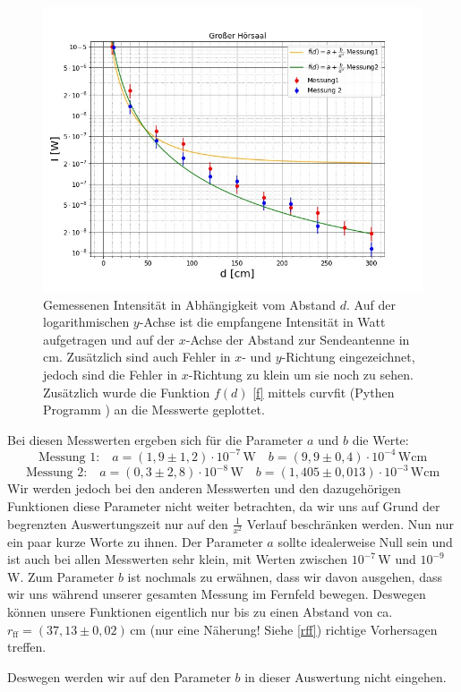 \documentclass[titlepage,11pt,a4paper,ngerman]{article}
\newcommand{\tx}[1]{\textrm{#1}}
\begin{document}
\begin{figure}[ht]
	\includegraphics[scale=0.5]{Bilder/Abstand-GrH.jpg}
	\centering
	\caption{Gemessenen Intensität in Abhängigkeit vom Abstand $d$. Auf der logarithmischen $y$-Achse ist die empfangene Intensität in Watt aufgetragen und auf der $x$-Achse der Abstand zur Sendeantenne in cm. Zusätzlich sind auch Fehler in $x$- und $y$-Richtung eingezeichnet, jedoch sind die Fehler in $x$-Richtung zu klein um sie noch zu sehen. Zusätzlich wurde die Funktion $f(d)$ \eqref{f} mittels curvfit (Pythen Programm \cite{curvescipy}) an die Messwerte geplottet.}
	\label{GrH-A}
\end{figure}
\FloatBarrier
Bei diesen Messwerten ergeben sich für die Parameter $a$ und $b$ die Werte:
\begin{equation*}
\tx{Messung 1:} \quad a = (1{,}9\pm1{,}2)\cdot10^{-7}\,\tx{W} \quad b = (9{,}9\pm0{,}4)\cdot10^{-4}\,\tx{Wcm}
\end{equation*}
\begin{equation*}
\tx{Messung 2:} \quad a = (0{,}3\pm2{,}8)\cdot10^{-8}\,\tx{W} \quad b = (1{,405\pm0{,}013})\cdot10^{-3} \,\tx{Wcm}
\end{equation*}
Wir werden jedoch bei den anderen Messwerten und den dazugehörigen Funktionen diese Parameter nicht weiter betrachten, da wir uns auf Grund der begrenzten Auswertungszeit nur auf den $\frac{1}{x^{2}}$ Verlauf beschränken werden. Nun nur ein paar kurze Worte zu ihnen. Der Parameter $a$ sollte idealerweise Null sein und ist auch bei allen Messwerten sehr klein, mit Werten zwischen $10^{-7}\,$W und $10^{-9}\,$W. Zum Parameter $b$ ist nochmals zu erwähnen, dass wir davon ausgehen, dass wir uns während unserer gesamten Messung im Fernfeld bewegen. Deswegen können unsere Funktionen eigentlich nur bis zu einen Abstand von ca. $r_{\tx{ff}}=(37{,}13\pm0{,}02)\,$cm (nur eine Näherung! Siehe \eqref{rff}) richtige Vorhersagen treffen.  \par 
Deswegen werden wir auf den Parameter $b$ in dieser Auswertung nicht eingehen.
\end{document}
